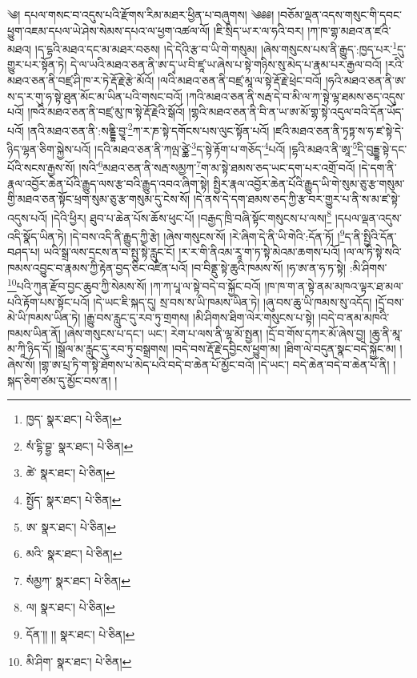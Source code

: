 \setcounter{footnote}{0} 
 ༄། དཔལ་གསང་བ་འདུས་པའི་རྫོགས་རིམ་མཐར་ཕྱིན་པ་བཞུགས། ༄༅༅། །བཅོམ་ལྡན་འདས་གསུང་གི་དབང་ཕྱུག་འཇམ་དཔལ་ཡེ་ཤེས་སེམས་དཔའ་ལ་ཕྱག་འཚལ་ལོ། །ཇི་སྲིད་ཡ་ར་ལ་ཧའི་བར། །ཀ་ཁ་གྷ་མཐའ་ན་ཛའི་མཐའ། །ད་དྷའི་མཐའ་དང་མ་མཐར་བཅས། །དེ་དེའི་རྩ་བ་ཡི་གེ་གསུམ། །ཞེས་གསུངས་པས་ནི་རྒྱུད་:ཁྱད་པར་\footnote{ཁྱད་  སྣར་ཐང་།  པེ་ཅིན། }དུ་གྱུར་པར་སྟོན་ཏེ། དེ་ལ་ཡའི་མཐའ་ཅན་ནི་ཨ་དྭ་ཡ་བི་ཛཱ་ཡ་ཞེས་པ་སྟེ་གཉིས་སུ་མེད་པ་རྣམ་པར་རྒྱལ་བའོ། །རའི་མཐའ་ཅན་ནི་བཛྲ་ཤི་ཁ་ར་ཏེ་རྡོ་རྗེ་རྩེ་མོའོ། །ལའི་མཐའ་ཅན་ནི་བཛྲ་མཱ་ལ་སྟེ་རྡོ་རྗེ་ཕྲེང་བའོ། །ཧའི་མཐའ་ཅན་ནི་ཨ་ས་ད་ར་གུ་ཧ་སྟེ་ཐུན་མོང་མ་ཡིན་པའི་གསང་བའོ། །ཀའི་མཐའ་ཅན་ནི་སརྦ་དེ་བ་མི་ལ་ཀ་སྟེ་ལྷ་ཐམས་ཅད་འདུས་པའོ། །ཁའི་མཐའ་ཅན་ནི་བཛྲ་མུ་ཁ་སྟེ་རྡོ་རྗེའི་སྒོའོ། །གྷའི་མཐའ་ཅན་ནི་བི་ན་ཡ་ཨ་མོ་གྷ་སྟེ་འདུལ་བའི་དོན་ཡོད་པའོ། །ནའི་མཐའ་ཅན་ནི་:སནྡྷི་བྱཱ་\footnote{སཾ་དྷི་བྷྱ་  སྣར་ཐང་།  པེ་ཅིན། }ཀ་ར་ཎ་སྟེ་དགོངས་པས་ལུང་སྟོན་པའོ། །ཛའི་མཐའ་ཅན་ནི་ཏྭཏྟ་ས་ཧ་ཛ་སྟེ་དེ་ཉིད་ལྷན་ཅིག་སྐྱེས་པའོ། །དའི་མཐའ་ཅན་ནི་ཀལྤ་ཙྪེ་\footnote{ཚེ་  སྣར་ཐང་།  པེ་ཅིན། }ད་སྟེ་རྟོག་པ་གཅོད་\footnote{སྤྱོད་  སྣར་ཐང་།  པེ་ཅིན། }པའོ། །དྷའི་མཐའ་ནི་ཨཱ་\footnote{ཨ་  སྣར་ཐང་།  པེ་ཅིན། }དི་བུདྡྷ་སྟེ་དང་པོའི་སངས་རྒྱས་སོ། །སའི་\footnote{མའི་  སྣར་ཐང་།  པེ་ཅིན། }མཐའ་ཅན་ནི་སརྦ་སམྱཀ་\footnote{སཾམྱཀ་  སྣར་ཐང་།  པེ་ཅིན། }ག་མ་སྟེ་ཐམས་ཅད་ཡང་དག་པར་འགྲོ་བའོ། །དེ་དག་ནི་རྣལ་འབྱོར་ཆེན་པོའི་རྒྱུད་ལས་རྩ་བའི་རྒྱུད་འབའ་ཞིག་སྟེ། སྤྱིར་རྣལ་འབྱོར་ཆེན་པོའི་རྒྱུད་ཡི་གེ་སུམ་ཅུ་རྩ་གསུམ་གྱི་མཐའ་ཅན་སྟོང་ཕྲག་སུམ་ཅུ་རྩ་གསུམ་དུ་ངེས་སོ། །དེ་ནས་དེ་དག་ཐམས་ཅད་ཀྱི་རྩ་བར་གྱུར་པ་ནི་ས་མ་ཛ་སྟེ་འདུས་པའོ། །དེའི་ཕྱིར། ཐུབ་པ་ཆེན་པོས་ཆོས་ཕུང་པོ། །བརྒྱད་ཁྲི་བཞི་སྟོང་གསུངས་པ་ལས།\footnote{ལ།  སྣར་ཐང་།  པེ་ཅིན། } །དཔལ་ལྡན་འདུས་འདི་སྣོད་ཡིན་ཏེ། །དེ་བས་འདི་ནི་རྒྱུད་ཀྱི་རྩེ། །ཞེས་གསུངས་སོ། །རེ་ཞིག་དེ་ནི་ཡི་གེའི་:དོན་ཏོ། །\footnote{དོན་།། །།  སྣར་ཐང་།  པེ་ཅིན། }ད་ནི་སྤྱིའི་དོན་བཤད་པ། ཡའི་སྒྲ་ལས་དྲངས་ན་བ་སྤུ་སྟེ་རླུང་ངོ། །ར་ར་གི་ནིའམ་རཱ་ག་ཏ་སྟེ་མེའམ་ཆགས་པའོ། །ལ་ལ་ཏི་སྟེ་སའི་ཁམས་འབྱུང་བ་རྣམས་ཀྱི་རྟེན་བྱད་ཅིང་འཛིན་པའོ། །བ་བིནྡུ་སྟེ་ཆུའི་ཁམས་སོ། །ཧ་ཨ་ན་ཧ་ཏ་སྟེ། :མི་ཤིགས་\footnote{མི་ཤིག་  སྣར་ཐང་།  པེ་ཅིན། }པའི་ཀུན་རྫོབ་བྱང་ཆུབ་ཀྱི་སེམས་སོ། །ཀ་ཀ་པཱ་ལ་སྟེ་བདེ་བ་སྐྱོང་བའོ། །ཁ་ཁ་ག་ན་སྟེ་ནམ་མཁའ་ལྟར་ཐ་མལ་པའི་རྟོག་པས་སྟོང་པའོ། །དེ་ཡང་ཇི་སྐད་དུ། སྲ་བས་ས་ཡི་ཁམས་ཡིན་ཏེ། །ཞུ་བས་ཆུ་ཡི་ཁམས་སུ་འདོད། །དྲོ་བས་མེ་ཡི་ཁམས་ཡིན་ཏེ། །རྒྱུ་བས་རླུང་དུ་རབ་ཏུ་གྲགས། །མི་ཤིགས་ཐིག་ལེར་གསུངས་པ་སྟེ། །བདེ་བ་ནམ་མཁའི་ཁམས་ཡིན་ནོ། །ཞེས་གསུངས་པ་དང་། ཡང་། རེག་པ་ལས་ནི་ལྷ་མོ་སྤྱན། །དྲོ་བ་གོས་དཀར་མོ་ཞེས་བྱ། །ཆུ་ནི་མཱ་མ་ཀཱི་ཉིད་དོ། །སྒྲོལ་མ་རླུང་དུ་རབ་ཏུ་བསྒྲགས། །བདེ་བས་རྡོ་རྗེ་དབྱིངས་ཕྱུག་མ། །ཐིག་ལེ་བདུན་སྣང་བདེ་སྐྱོང་མ། །ཞེས་སོ། །གྷ་ཨ་པྲ་ཏི་ག་སྟེ་ཐོགས་པ་མེད་པའི་བདེ་བ་ཆེན་པོ་མྱོང་བའོ། །དེ་ཡང་། བདེ་ཆེན་བདེ་བ་ཆེན་པོ་ནི། །སྐད་ཅིག་ཙམ་དུ་མྱོང་བས་ན། །
